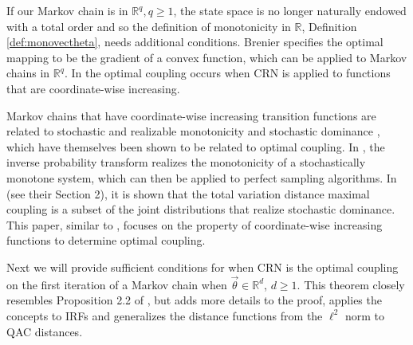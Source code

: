 \documentclass[12pt]{article}
\theoremstyle{plain}%
\newtheorem{lemma}[theorem]{Lemma}
\theoremstyle{definition}
\begin{document}

If our Markov chain is in $\mathbb{R}^q, q\geq 1$, the state space is no longer naturally endowed with a total order and so the definition of monotonicity in $\mathbb{R}$, Definition \ref{def:monovectheta}, needs additional conditions.  Brenier specifies the optimal mapping to be the gradient of a convex function, which can be applied to Markov chains in $\mathbb{R}^q$. In \cite{crn} the optimal coupling occurs when CRN is applied to functions that are coordinate-wise increasing. 

Markov chains that have coordinate-wise increasing transition functions are related to stochastic and realizable monotonicity \cite{fill2002,fill1999} and stochastic dominance \cite{strassensthm}, which have themselves been shown to be related to optimal coupling. In \cite{fill2002}, the inverse probability transform realizes the monotonicity of a stochastically monotone system, which can then be applied to perfect sampling algorithms. In  \cite{strassensthm} (see their Section 2), it is shown that the total variation distance maximal coupling is a subset of the joint distributions that realize stochastic dominance. This paper, similar to \cite{crn}, focuses on the property of coordinate-wise increasing functions to determine optimal coupling. 


Next we will provide sufficient conditions for when CRN is the optimal coupling on the first iteration of a Markov chain when $\vec{\theta}\in\mathbb{R}^d$, $d\geq 1$. This theorem closely resembles Proposition 2.2 of \cite{crn}, but adds more details to the proof, applies the concepts to IRFs and generalizes the distance functions from the $\ell^2$ norm to QAC distances.
\end{document}
